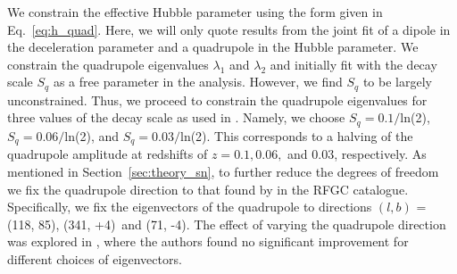\documentclass[fleqn,usenatbib]{mnras}
\begin{document}
We constrain the effective Hubble parameter %
{using the form given in} Eq.~\eqref{eq:h_quad}. {Here, we will only} quote results from the joint fit of a dipole {in the deceleration parameter} and a quadrupole {in the Hubble parameter}. {We constrain the quadrupole eigenvalues $\lambda_1$ and $\lambda_2$ and initially fit with the decay scale $S_q$ as a free parameter in the analysis. However, we find $S_q$ to be largely unconstrained. Thus, we proceed to constrain the quadrupole eigenvalues for three values of the decay scale as used in . Namely, we choose }
$S_q=0.1/$ln(2), $S_q=0.06/$ln(2), and $S_q=0.03/$ln(2). This %
corresponds to a halving of the quadrupole amplitude at redshifts of $z=0.1, 0.06,$ and $0.03${, respectively}. 
{As mentioned in Section~\ref{sec:theory_sn}, to further} reduce the degrees of freedom we fix the quadrupole direction to that found by \citet{Parnovsky} {in the RFGC catalogue}. %
Specifically, {we fix the} eigenvectors {of the quadrupole} %
to {directions} $(l, b)$ = (118, 85)\textdegree, (341, +4)\textdegree\ and (71, -4)\textdegree. The {effect of varying the} quadrupole direction was explored in , {where the authors found} no significant improvement for different choices of eigenvectors.
\end{document}
